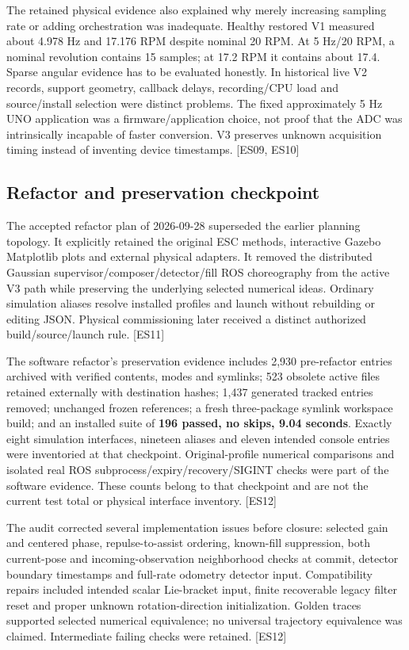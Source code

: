 \documentclass[
  10pt,
  letterpaper,
]{article}
\begin{document}
The retained physical evidence also explained why merely increasing
sampling rate or adding orchestration was inadequate. Healthy restored
V1 measured about 4.978 Hz and 17.176 RPM despite nominal 20 RPM. At 5
Hz/20 RPM, a nominal revolution contains 15 samples; at 17.2 RPM it
contains about 17.4. Sparse angular evidence has to be evaluated
honestly. In historical live V2 records, support geometry, callback
delays, recording/CPU load and source/install selection were distinct
problems. The fixed approximately 5 Hz UNO application was a
firmware/application choice, not proof that the ADC was intrinsically
incapable of faster conversion. V3 preserves unknown acquisition timing
instead of inventing device timestamps. {[}ES09, ES10{]}

\subsection{Refactor and preservation
checkpoint}\label{refactor-and-preservation-checkpoint}

The accepted refactor plan of 2026-09-28 superseded the earlier planning
topology. It explicitly retained the original ESC methods, interactive
Gazebo Matplotlib plots and external physical adapters. It removed the
distributed Gaussian supervisor/composer/detector/fill ROS choreography
from the active V3 path while preserving the underlying selected
numerical ideas. Ordinary simulation aliases resolve installed profiles
and launch without rebuilding or editing JSON. Physical commissioning
later received a distinct authorized build/source/launch rule.
{[}ES11{]}

The software refactor's preservation evidence includes 2,930
pre-refactor entries archived with verified contents, modes and
symlinks; 523 obsolete active files retained externally with destination
hashes; 1,437 generated tracked entries removed; unchanged frozen
references; a fresh three-package symlink workspace build; and an
installed suite of \textbf{196 passed, no skips, 9.04 seconds}. Exactly
eight simulation interfaces, nineteen aliases and eleven intended
console entries were inventoried at that checkpoint. Original-profile
numerical comparisons and isolated real ROS
subprocess/expiry/recovery/SIGINT checks were part of the software
evidence. These counts belong to that checkpoint and are not the current
test total or physical interface inventory. {[}ES12{]}

The audit corrected several implementation issues before closure:
selected gain and centered phase, repulse-to-assist ordering, known-fill
suppression, both current-pose and incoming-observation neighborhood
checks at commit, detector boundary timestamps and full-rate odometry
detector input. Compatibility repairs included intended scalar
Lie-bracket input, finite recoverable legacy filter reset and proper
unknown rotation-direction initialization. Golden traces supported
selected numerical equivalence; no universal trajectory equivalence was
claimed. Intermediate failing checks were retained. {[}ES12{]}
\end{document}
